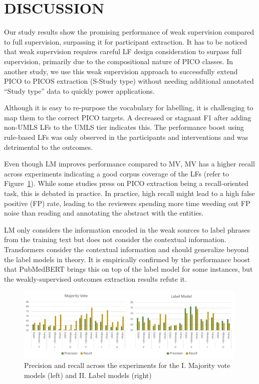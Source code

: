 \documentclass[10.7pt,]{article}
\begin{document}
\section{DISCUSSION}\label{discussion}
%
Our study results show the promising performance of weak supervision compared to full supervision, surpassing it for participant extraction.
It has to be noticed that weak supervision requires careful LF design consideration to surpass full supervision, primarily due to the compositional nature of PICO classes.
In another study, we use this weak supervision approach to successfully extend PICO to PICOS extraction (S-Study type) without needing additional annotated ``Study type'' data to quickly power applications.\cite{dhrangadhariya2023picos}


Although it is easy to re-purpose the vocabulary for labelling, it is challenging to map them to the correct PICO targets.
A decreased or stagnant F1 after adding non-UMLS LFs to the UMLS tier indicates this.
The performance boost using rule-based LFs was only observed in the participants and interventions and was detrimental to the outcomes.


Even though LM improves performance compared to MV, MV has a higher recall across experiments indicating a good corpus coverage of the LFs (refer to Figure~\ref{fig:precRecall}).
While some studies press on PICO extraction being a recall-oriented task, this is debated in practice.
In practice, high recall might lead to a high false positive (FP) rate, leading to the reviewers spending more time weeding out FP noise than reading and annotating the abstract with the entities.\cite{liu2021sent2span}


LM only considers the information encoded in the weak sources to label phrases from the training text but does not consider the contextual information.
Transformers consider the contextual information and should generalize beyond the label models in theory.
It is empirically confirmed by the performance boost that PubMedBERT brings this on top of the label model for some instances, but the weakly-supervised outcomes extraction results refute it.
%
\begin{figure}[!h]
    \centering
    \includegraphics[width=0.99\textwidth]{figures/precRecall.pdf}
    \caption{Precision and recall across the experiments for the I. Majority vote models (left) and II. Label models (right)}
    \label{fig:precRecall}
\end{figure}
%
%
%
\end{document}
